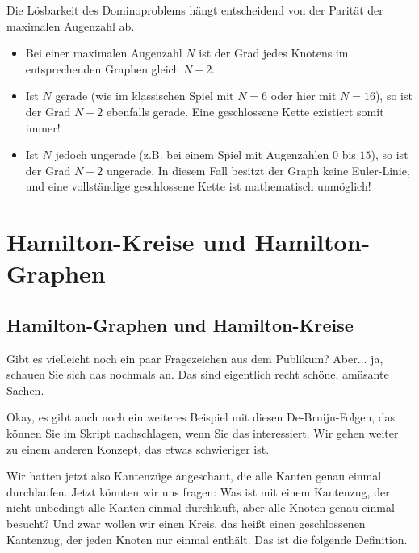 \begin{didactic-insight}
Die Lösbarkeit des Dominoproblems hängt entscheidend von der Parität der maximalen Augenzahl ab. 
\begin{itemize}
    \item Bei einer maximalen Augenzahl $N$ ist der Grad jedes Knotens im entsprechenden Graphen gleich $N + 2$.
    \item Ist $N$ gerade (wie im klassischen Spiel mit $N=6$ oder hier mit $N=16$), so ist der Grad $N+2$ ebenfalls gerade. Eine geschlossene Kette existiert somit immer!
    \item Ist $N$ jedoch ungerade (z.B. bei einem Spiel mit Augenzahlen $0$ bis $15$), so ist der Grad $N+2$ ungerade. In diesem Fall besitzt der Graph keine Euler-Linie, und eine vollständige geschlossene Kette ist mathematisch unmöglich!
\end{itemize}
\end{didactic-insight}


\section{Hamilton-Kreise und Hamilton-Graphen}

\subsection{Hamilton-Graphen und Hamilton-Kreise}

\begin{spoken-clean}[00:31:34 - 00:32:29]
Gibt es vielleicht noch ein paar Fragezeichen aus dem Publikum? Aber... ja, schauen Sie sich das nochmals an. Das sind eigentlich recht schöne, amüsante Sachen.

Okay, es gibt auch noch ein weiteres Beispiel mit diesen De-Bruijn-Folgen, das können Sie im Skript nachschlagen, wenn Sie das interessiert. Wir gehen weiter zu einem anderen Konzept, das etwas schwieriger ist.

Wir hatten jetzt also Kantenzüge angeschaut, die alle Kanten genau einmal durchlaufen. Jetzt könnten wir uns fragen: Was ist mit einem Kantenzug, der nicht unbedingt alle Kanten einmal durchläuft, aber alle Knoten genau einmal besucht? Und zwar wollen wir einen Kreis, das heißt einen geschlossenen Kantenzug, der jeden Knoten nur einmal enthält. Das ist die folgende Definition. 
\end{spoken-clean}

